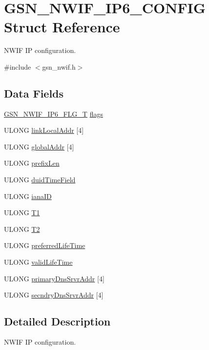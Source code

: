 \hypertarget{a00171}{
\section{GSN\_\-NWIF\_\-IP6\_\-CONFIG Struct Reference}
\label{a00171}
}


NWIF IP configuration.  




{\ttfamily \#include $<$gsn\_\-nwif.h$>$}

\subsection*{Data Fields}
\begin{DoxyCompactItemize}
\item 
\hyperlink{a00670_gaeae6a78e867541f488c5b1db9f7508f7}{GSN\_\-NWIF\_\-IP6\_\-FLG\_\-T} \hyperlink{a00171_ac2108b3a7b612888050ddf7c6725d707}{flags}
\item 
ULONG \hyperlink{a00171_a4632397f7ce2a59255969233e3f055b2}{linkLocalAddr} \mbox{[}4\mbox{]}
\item 
ULONG \hyperlink{a00171_abfafb3d633968d979d6d8e556f480943}{globalAddr} \mbox{[}4\mbox{]}
\item 
ULONG \hyperlink{a00171_a8fcc1a040757ed6cb91e94b1b995d953}{prefixLen}
\item 
ULONG \hyperlink{a00171_a2adbced60388bc8a9e953040c48a1af1}{duidTimeField}
\item 
ULONG \hyperlink{a00171_adbf55961e244d682c540f95f326e00a2}{ianaID}
\item 
ULONG \hyperlink{a00171_a342daed1ead97af0e1933a8b4a68a10b}{T1}
\item 
ULONG \hyperlink{a00171_ac6512bec63bc298f30b14c885d518679}{T2}
\item 
ULONG \hyperlink{a00171_aa1af5850f2fa01dba672f616daf05b72}{preferredLifeTime}
\item 
ULONG \hyperlink{a00171_aa5292f5141e7b76124f517c5e29b1c69}{validLifeTime}
\item 
ULONG \hyperlink{a00171_af5d07e64903810b25771526492c59b81}{primaryDnsSrvrAddr} \mbox{[}4\mbox{]}
\item 
ULONG \hyperlink{a00171_a89652a748ab7f7355a06d17d537f5a1d}{secndryDnsSrvrAddr} \mbox{[}4\mbox{]}
\end{DoxyCompactItemize}


\subsection{Detailed Description}
NWIF IP configuration. 

